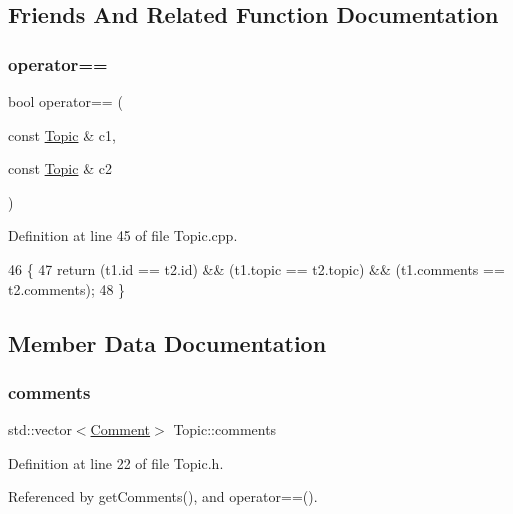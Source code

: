 \subsection{Friends And Related Function Documentation}
\mbox{\label{class_topic_adc7b3e2ce62c70f0ea7a2dcb1649bd24}} 
\subsubsection{\texorpdfstring{operator==}{operator==}}
{\footnotesize\ttfamily bool operator== (\begin{DoxyParamCaption}\item[{const \hyperlink{class_topic}{Topic} \&}]{c1,  }\item[{const \hyperlink{class_topic}{Topic} \&}]{c2 }\end{DoxyParamCaption})\hspace{0.3cm}{\ttfamily [friend]}}



Definition at line 45 of file Topic.\+cpp.


\begin{DoxyCode}
46 \{
47     \textcolor{keywordflow}{return}  (t1.id == t2.id) && (t1.topic == t2.topic) && (t1.comments == t2.comments);
48 \}
\end{DoxyCode}


\subsection{Member Data Documentation}
\mbox{\label{class_topic_a7302f2cd0169b84d3e4e58af7bc1f73d}} 
\subsubsection{\texorpdfstring{comments}{comments}}
{\footnotesize\ttfamily std\+::vector$<$\hyperlink{class_comment}{Comment}$>$ Topic\+::comments\hspace{0.3cm}{\ttfamily [private]}}



Definition at line 22 of file Topic.\+h.



Referenced by get\+Comments(), and operator==().

